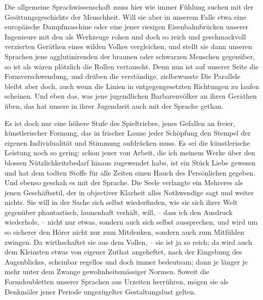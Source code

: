 Die allgemeine Sprachwissenschaft muss hier wie immer Fühlung suchen mit der Gesittungsgeschichte der Menschheit. Will sie aber in unserem Falle etwa eine europäische Dampfmaschine oder eine jener riesigen Eisenbahnbrücken unserer Ingenieure mit den als Werkzeuge rohen und doch so reich und geschmackvoll verzierten Geräthen eines wilden Volkes vergleichen, und stellt sie dann unseren Sprachen jene agglutinirenden der braunen oder schwarzen Menschen gegenüber, so ist  als wären plötzlich die Rollen vertauscht. Denn nun ist auf unserer \label{fp.344} Seite die Formverschwendung, und drüben die verständige, zielbewusste  Die Parallele bleibt aber doch, auch wenn die Linien in entgegengesetzten Richtungen zu laufen scheinen. Und eben das, was jene jugendlichen Barbarenvölker an ihren Geräthen üben, das hat unsere  in ihrer Jugendzeit auch mit der Sprache gethan.

Es ist doch nur eine höhere Stufe des Spieltriebes, jenes Gefallen an freier, künstlerischer Formung, das in frischer Laune jeder Schöpfung den Stempel der eigenen Individualität und Stimmung aufdrücken muss. Es sei die künstlerische Leistung noch so gering: schon jener  von Arbeit, die ich meinem Werke über den blossen Nützlichkeitsbedarf hinaus zugewendet habe, ist ein Stück Liebe gewesen und hat dem todten Stoffe für alle Zeiten einen Hauch des Persönlichen gegeben. Und ebenso geschah es mit der Sprache. Die Seele verlangte ein Mehreres als jenen Geschäftsstil, der in objectiver Klarheit alles Nothwendige sagt und weiter nichts. Sie will in der Sache sich selbst wiederfinden, wie sie sich ihrer Welt gegenüber  phantastisch, launenhaft verhält, will, – dass ich den Ausdruck wiederhole, – nicht nur etwas, sondern auch sich selbst aussprechen, und wird um so sicherer den Hörer nicht nur zum Mitdenken, sondern auch zum Mitfühlen zwingen. Da wirthschaftet sie aus dem Vollen, – sie ist ja so reich; da  wird auch dem Kleinsten etwas von eigener Zuthat angeheftet,  nach der Eingebung des Augenblickes, scheinbar \label{sp.362} regellos und doch immer bedeutsam; dann je länger je mehr unter dem Zwange gewohnheitsmässiger Normen. Soweit die Formdoubletten unserer Sprachen aus Urzeiten herrühren, mögen sie als Denkmäler jener Periode ungezügelter Gestaltungslust gelten.


